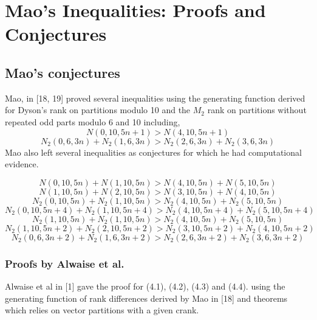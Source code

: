 \chapter{Mao's Inequalities: Proofs and Conjectures}
\section{Mao's conjectures}

Mao, in [18, 19] proved several inequalities using the generating function derived for Dyson's rank on partitions modulo 10 and the $M_2$ rank on partitions without repeated odd parts modulo 6 and 10 including,
$$N(0,10,5n+1)>N(4,10,5n+1)$$
$$N_2(0,6,3n)+N_2(1,6,3n) > N_2(2,6,3n)+ N_2(3,6,3n)$$
Mao also left several inequalities as conjectures for which he had computational evidence.

\newpage
\begin{conjecture}
\begin{equation}
    N(0,10,5n)+N(1,10,5n) > N(4,10,5n)+N(5,10,5n)
\end{equation}
\begin{equation}
    N(1,10,5n)+N(2,10,5n) > N(3,10,5n)+N(4,10,5n)
\end{equation}
\begin{equation}
    N_2(0,10,5n)+N_2(1,10,5n) > N_2(4,10,5n)+N_2(5,10,5n)
\end{equation}
\begin{equation}
    N_2(0,10,5n+4)+N_2(1,10,5n+4) > N_2(4,10,5n+4)+N_2(5,10,5n+4)
\end{equation}
\begin{equation}
    N_2(1,10,5n)+N_2(1,10,5n) > N_2(4,10,5n)+N_2(5,10,5n)
\end{equation}
\begin{equation}
    N_2(1,10,5n+2)+N_2(2,10,5n+2) > N_2(3,10,5n+2)+N_2(4,10,5n+2)
\end{equation}
\begin{equation}
    N_2(0,6,3n+2)+N_2(1,6,3n+2) > N_2(2,6,3n+2)+N_2(3,6,3n+2)
\end{equation}
\end{conjecture}

\subsection{Proofs by Alwaise et al.}

Alwaise et al in [1] gave the proof for (4.1), (4.2), (4.3) and (4.4).
using the generating function of rank differences derived by Mao in [18] and theorems which relies on vector partitions with a given crank.

